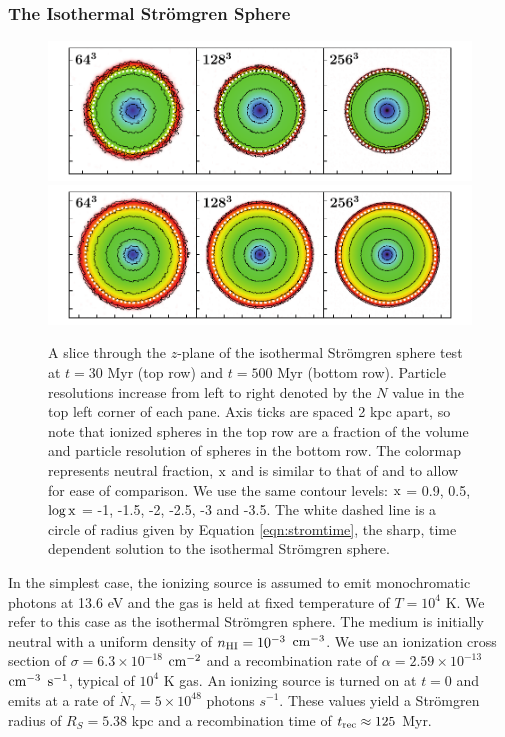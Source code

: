 \documentclass[fleq,usenatbib]{mnras}
\newcommand{\strom}{Str\"omgren}
\begin{document}
{\subsubsection{The Isothermal \strom{} Sphere}
\begin{figure}
\includegraphics[width=1\linewidth]{Figures/strom_slice_iso_030.pdf}
\includegraphics[width=1\linewidth]{Figures/strom_slice_iso_500.pdf}
\caption{A slice through the $z$-plane of the isothermal \strom{} sphere
test at $t=30$ Myr (top row) and $t=500$ Myr (bottom row). Particle 
resolutions increase from left to right denoted by the $N$ value in the top 
left corner of each pane. Axis ticks are spaced 2 kpc apart, so note that 
ionized spheres in the top row are a fraction of the volume and particle 
resolution of spheres in the bottom row. The colormap represents neutral 
fraction, $\rm x$ and is similar to that of \protect\cite{pawlikSchaye08} and 
\protect\cite{pawlikSchaye11} to allow for ease of comparison.  We use the same
contour levels: $\rm x$ = 0.9, 0.5, $\log \rm x$ = -1, -1.5, 
-2, -2.5, -3 and -3.5. The white dashed line is a circle of radius given by 
Equation \ref{eqn:stromtime}, the sharp, time dependent solution to the 
isothermal \strom{} sphere.}
\label{fig:stromslice}
\end{figure}
In the simplest case, the ionizing source is assumed to emit monochromatic 
photons at 13.6 eV and the gas is held at fixed temperature of $T=10^4$ K.
We refer to this case as the isothermal \strom{} sphere.  The medium is initially 
neutral with a uniform density of $n_{\rm HI} = 
10^{-3}$ $\rm cm^{-3}$. We use an 
ionization cross section of $\sigma = 6.3 \times 10^{-18}$ $\rm cm^{-2}$ and a 
recombination rate of $\alpha = 2.59 \times 10^{-13}$ $\rm cm^{-3}$ $\rm 
s^{-1}$, typical of $10^4$ K gas.
An ionizing source is turned on at $t=0$ and emits at 
a rate of $\dot{N}_\gamma = 5 \times 10^{48}$ photons $s^{-1}$.  These values yield a \strom{} radius of 
$R_S = 5.38$ kpc and a recombination time of $t_{\rm rec} \approx  125$ Myr. 

}
\end{document}
